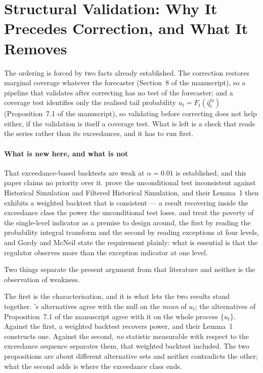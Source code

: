 \documentclass[preprint,11pt,authoryear]{elsarticle}
\newcommand{\1}{\boldsymbol{1}}
\begin{document}
\section{Structural Validation: Why It Precedes Correction, and What It Removes}
\label{app:precede}

The ordering is forced by two facts already established. The correction restores
marginal coverage whatever the forecaster (Section~8 of the manuscript), so a
pipeline that validates after correcting has no test of the forecaster; and a
coverage test identifies only the realised tail probability
$u_t = F_t(\hat q^{lo}_t)$ (Proposition~7.1 of the manuscript), so validating
before correcting does not help either, if the validation is itself a coverage
test. What is left is a check that reads the series rather than its exceedances,
and it has to run first.

\paragraph{What is new here, and what is not} That exceedance-based backtests are
weak at $\alpha = 0.01$ is established, and this paper claims no priority over
it. \citet{escanciano2012pitfalls} prove the unconditional test inconsistent
against Historical Simulation and Filtered Historical Simulation, and their
Lemma~1 then exhibits a weighted backtest that is consistent --- a result
recovering inside the exceedance class the power the unconditional test loses.
\citet{gordy2020spectral} and \citet{kratz2018multinomial} treat the poverty of
the single-level indicator as a premise to design around, the first by reading
the probability integral transform and the second by reading exceptions at four
levels, and Gordy and McNeil state the requirement plainly: what is essential is
that the regulator observes more than the exception indicator at one level.

Two things separate the present argument from that literature and neither is the
observation of weakness.

The first is the characterisation, and it is what lets the two results stand
together. \citet{escanciano2012pitfalls}'s alternatives agree with the null on
the \emph{mean} of $u_t$; the alternatives of
Proposition~7.1 of the manuscript agree with it on the whole process
$\{u_t\}$. Against the first, a weighted backtest recovers power, and their
Lemma~1 constructs one. Against the second, \emph{no} statistic measurable with
respect to the exceedance sequence separates them, that weighted backtest
included. The two propositions are about different alternative sets and neither
contradicts the other; what the second adds is where the exceedance class ends.
\end{document}
